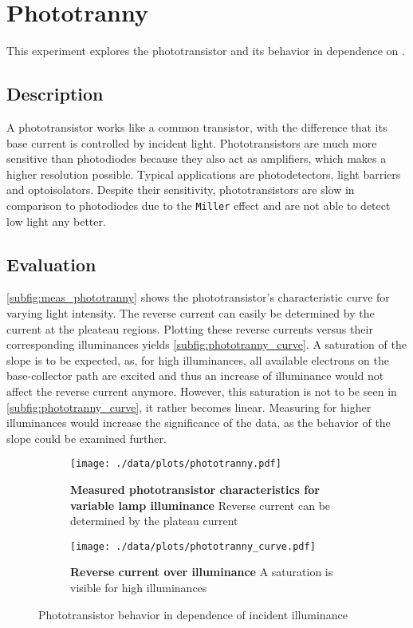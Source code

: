 \chapter{Phototranny}
This experiment explores the phototransistor and its behavior in dependence on .

\section{Description}
A phototransistor works like a common transistor, with the difference that its base current is controlled by incident light.
Phototransistors are much more sensitive than photodiodes because they also act as amplifiers, which makes a higher resolution possible.
Typical applications are photodetectors, light barriers and optoisolators.
Despite their sensitivity, phototransistors are slow in comparison to photodiodes due to the \texttt{Miller} effect and are not able to detect low light any better.

\section{Evaluation}
\autoref{subfig:meas_phototranny} shows the phototransistor's characteristic curve for varying light intensity.
The reverse current can easily be determined by the current at the pleateau regions.
Plotting these reverse currents versus their corresponding illuminances yields \autoref{subfig:phototranny_curve}.
A saturation of the slope is to be expected, as, for high illuminances, all available electrons on the base-collector path are excited and thus an increase of illuminance would not affect the reverse current anymore.
However, this saturation is not to be seen in \autoref{subfig:phototranny_curve}, it rather becomes linear.
Measuring for higher illuminances would increase the significance of the data, as the behavior of the slope could be examined further.

\begin{figure}[btp]
	\centering
	\begin{subfigure}{0.4\textwidth}
		\centering
		\texttt{[image: ./data/plots/phototranny.pdf]}
		\caption[Measured phototransistor characteristics for variable lamp illuminance]{\textbf{Measured phototransistor characteristics for variable lamp illuminance} Reverse current can be determined by the plateau current}
		\label{subfig:meas_phototranny}
	\end{subfigure}\quad
	\begin{subfigure}{0.4\textwidth}
		\centering
		\texttt{[image: ./data/plots/phototranny\_curve.pdf]}
		\caption[Reverse current over illuminance]{\textbf{Reverse current over illuminance} A saturation is visible for high illuminances}
		\label{subfig:phototranny_curve}
	\end{subfigure}
	\caption{Phototransistor behavior in dependence of incident illuminance}
\end{figure}

